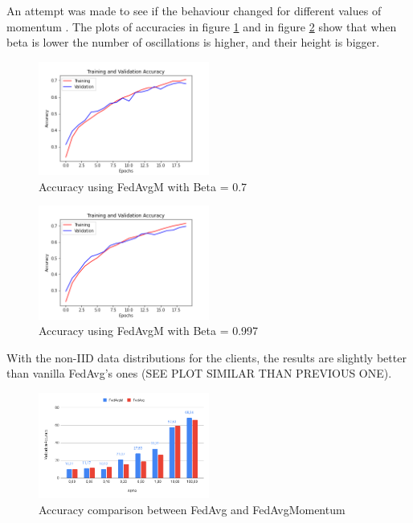 \documentclass[twocolumn]{article}
\begin{document}
An attempt was made to see if the behaviour changed for different values of momentum . The plots of accuracies in figure \ref{AccFedAvgB0.7} and in figure \ref{AccFedAvgB0.997} show that when beta is lower the number of oscillations is higher, and their height is bigger.
\begin{figure}
    \centering
    \includegraphics[width=0.5\textwidth,height=.3\textheight]{5_AccuracyFedAvgM_Beta0.7.png}
    \caption{Accuracy using FedAvgM with Beta = 0.7}
     \label{AccFedAvgB0.7} 
\end{figure}

\begin{figure}
    \centering
    \includegraphics[width=0.5\textwidth,height=.3\textheight]{5_AccuracyFedAvgM_Beta0.997.png}
    \caption{Accuracy using FedAvgM with Beta = 0.997}
     \label{AccFedAvgB0.997} 
\end{figure}

With the non-IID data distributions for the clients, the results are slightly better than vanilla FedAvg's ones (SEE PLOT SIMILAR THAN PREVIOUS ONE). 

\begin{figure}
    \centering
    \includegraphics[width=0.5\textwidth,height=.3\textheight]{FedAvgMvsFedAvg.png}
    \caption{Accuracy comparison between FedAvg and FedAvgMomentum}
    \label{FedAvgvsFedM} 
\end{figure}
\end{document}
